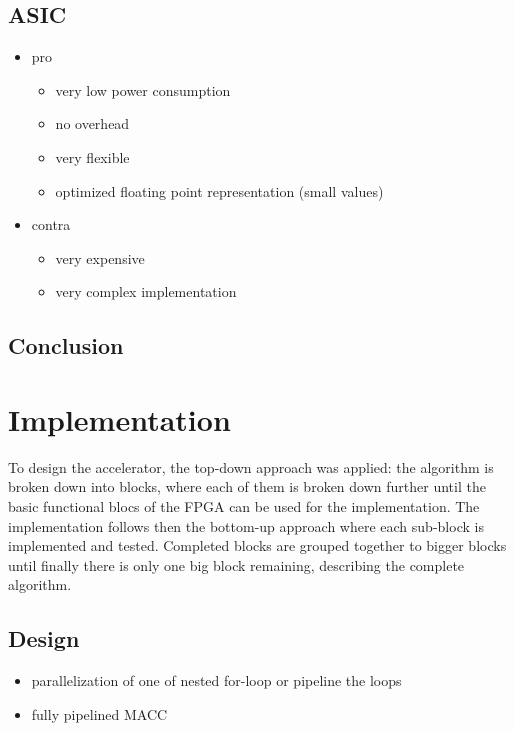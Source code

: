 \documentclass[mscthesis]{usiinfthesis}
\begin{document}
\subsection{ASIC}
\begin{itemize}
    \item pro
    \begin{itemize}
        \item very low power consumption
        \item no overhead
        \item very flexible
        \item optimized floating point representation (small values)
    \end{itemize}
    \item contra
    \begin{itemize}
        \item very expensive
        \item very complex implementation
    \end{itemize}
\end{itemize}

\subsection{Conclusion}

\section{Implementation}
\label{ch:acc_imp}

To design the accelerator, the top-down approach was applied: the algorithm is
broken down into blocks, where each of them is broken down further until the
basic functional blocs of the FPGA can be used for the implementation. The
implementation follows then the bottom-up approach where each sub-block is
implemented and tested. Completed blocks are grouped together to bigger blocks
until finally there is only one big block remaining, describing the complete
algorithm.

\subsection{Design}
\label{ch:acc_des}
\begin{itemize}
    \item parallelization of one of nested for-loop or pipeline the loops
    \item fully pipelined MACC
\end{itemize}
\end{document}
